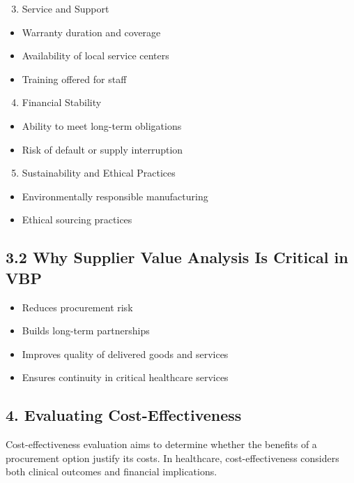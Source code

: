 \documentclass[10pt]{article}
\begin{document}
\begin{enumerate}
  \setcounter{enumi}{2}
  \item Service and Support
\end{enumerate}

\begin{itemize}
  \item Warranty duration and coverage
  \item Availability of local service centers
  \item Training offered for staff
\end{itemize}

\begin{enumerate}
  \setcounter{enumi}{3}
  \item Financial Stability
\end{enumerate}

\begin{itemize}
  \item Ability to meet long-term obligations
  \item Risk of default or supply interruption
\end{itemize}

\begin{enumerate}
  \setcounter{enumi}{4}
  \item Sustainability and Ethical Practices
\end{enumerate}

\begin{itemize}
  \item Environmentally responsible manufacturing
  \item Ethical sourcing practices
\end{itemize}

\subsection*{3.2 Why Supplier Value Analysis Is Critical in VBP}
\begin{itemize}
  \item Reduces procurement risk
  \item Builds long-term partnerships
  \item Improves quality of delivered goods and services
  \item Ensures continuity in critical healthcare services
\end{itemize}

\subsection*{4. Evaluating Cost-Effectiveness}
Cost-effectiveness evaluation aims to determine whether the benefits of a procurement option justify its costs. In healthcare, cost-effectiveness considers both clinical outcomes and financial implications.
\end{document}
